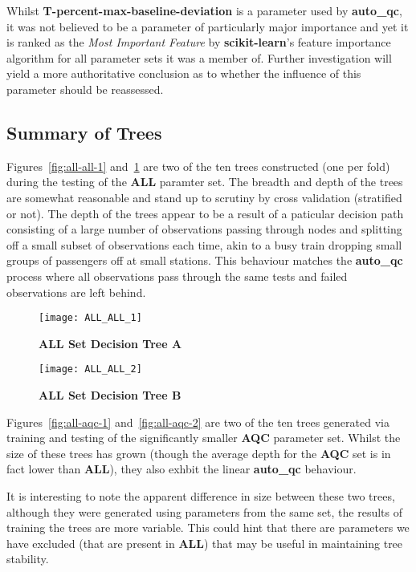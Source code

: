 Whilst \textbf{T-percent-max-baseline-deviation} is a parameter used by
\textbf{auto\_qc}, it was not believed to be a parameter of
particularly major importance and yet it is ranked as the \textit{Most
Important Feature} by \textbf{scikit-learn}'s feature importance algorithm
for all parameter sets it was a member of. Further investigation will yield a
more authoritative conclusion as to whether the influence of this parameter
should be reassessed.


\subsection{Summary of Trees}

Figures~\ref{fig:all-all-1} and~\ref{fig:all-all-2} are two of the ten trees
constructed (one per fold) during the testing of the \textbf{ALL} paramter set.
The breadth and depth of the trees are somewhat reasonable and stand up to
scrutiny by cross validation (stratified or not). The depth of the trees appear
to be a result of a paticular decision path consisting of a large number of
observations passing through nodes and splitting off a small subset of
observations each time, akin to a busy train dropping small groups of
passengers off at small stations. This behaviour matches the \textbf{auto\_qc}
process where all observations pass through the same tests and failed
observations are left behind.



\begin{figure}[htbp!]
    \centering
    \texttt{[image: ALL\_ALL\_1]}
    \caption[all-all-1]{\textbf{ALL Set Decision Tree A}}
    \label{fig:all-all-1}

    \vspace{20mm}

    \texttt{[image: ALL\_ALL\_2]}
    \caption[all-all-2]{\textbf{ALL Set Decision Tree B}}
    \label{fig:all-all-2}
\end{figure}

Figures~\ref{fig:all-aqc-1} and~\ref{fig:all-aqc-2} are two of the ten trees
generated via training and testing of the significantly smaller \textbf{AQC}
parameter set. Whilst the size of these trees has grown (though the average
depth for the \textbf{AQC} set is in fact lower than \textbf{ALL}), they also
exhbit the linear \textbf{auto\_qc} behaviour.

It is interesting to note the apparent difference in size between these two
trees, although they were generated using parameters from the same set, the
results of training the trees are more variable. This could hint that there are
parameters we have excluded (that are present in \textbf{ALL}) that may
be useful in maintaining tree stability.

